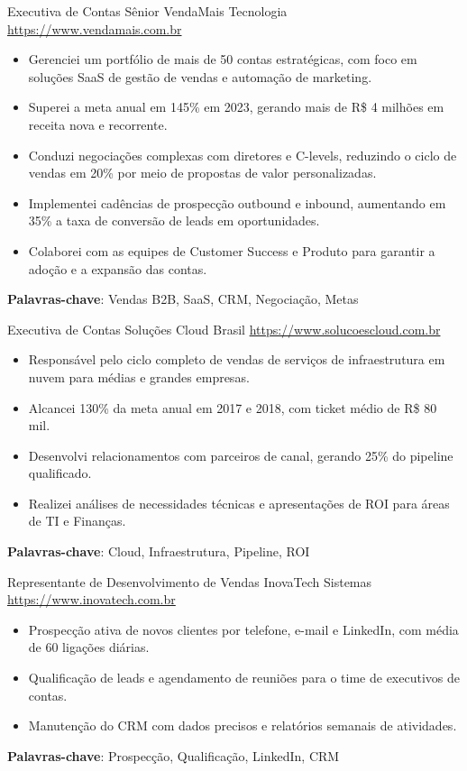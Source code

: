 \documentclass[a4paper, serif, 10pt]{moderncv}
\begin{document}
        {Executiva de Contas Sênior}
        {VendaMais Tecnologia}
        {\url{https://www.vendamais.com.br}}
        {}
        {\begin{itemize}
\item Gerenciei um portfólio de mais de 50 contas estratégicas, com foco em soluções SaaS de gestão de vendas e automação de marketing.
\item Superei a meta anual em 145\% em 2023, gerando mais de R\$ 4 milhões em receita nova e recorrente.
\item Conduzi negociações complexas com diretores e C-levels, reduzindo o ciclo de vendas em 20\% por meio de propostas de valor personalizadas.
\item Implementei cadências de prospecção outbound e inbound, aumentando em 35\% a taxa de conversão de leads em oportunidades.
\item Colaborei com as equipes de Customer Success e Produto para garantir a adoção e a expansão das contas.
\end{itemize}
\textbf{Palavras-chave}: Vendas B2B, SaaS, CRM, Negociação, Metas}

        {Executiva de Contas}
        {Soluções Cloud Brasil}
        {\url{https://www.solucoescloud.com.br}}
        {}
        {\begin{itemize}
\item Responsável pelo ciclo completo de vendas de serviços de infraestrutura em nuvem para médias e grandes empresas.
\item Alcancei 130\% da meta anual em 2017 e 2018, com ticket médio de R\$ 80 mil.
\item Desenvolvi relacionamentos com parceiros de canal, gerando 25\% do pipeline qualificado.
\item Realizei análises de necessidades técnicas e apresentações de ROI para áreas de TI e Finanças.
\end{itemize}
\textbf{Palavras-chave}: Cloud, Infraestrutura, Pipeline, ROI}

        {Representante de Desenvolvimento de Vendas}
        {InovaTech Sistemas}
        {\url{https://www.inovatech.com.br}}
        {}
        {\begin{itemize}
\item Prospecção ativa de novos clientes por telefone, e-mail e LinkedIn, com média de 60 ligações diárias.
\item Qualificação de leads e agendamento de reuniões para o time de executivos de contas.
\item Manutenção do CRM com dados precisos e relatórios semanais de atividades.
\end{itemize}
\textbf{Palavras-chave}: Prospecção, Qualificação, LinkedIn, CRM}
\end{document}
